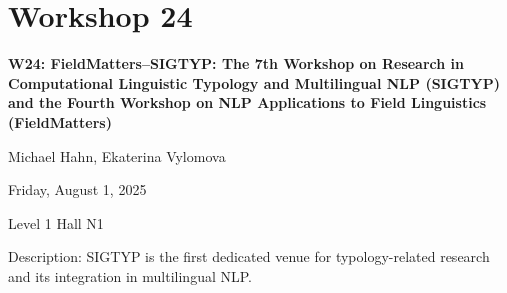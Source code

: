 \clearpage


\section[W24: FieldMatters–SIGTYP: The 7th Workshop on Research in Computational Linguistic Typology and Multilingual NLP (SIGTYP) and the Fourth Workshop on NLP Applications to Field Linguistics (FieldMatters)]{Workshop 24}

\begin{center}
    {\Large \textbf{W24: FieldMatters–SIGTYP: The 7th Workshop on Research in Computational Linguistic Typology and Multilingual NLP (SIGTYP) and the Fourth Workshop on NLP Applications to Field Linguistics (FieldMatters)}}

Michael Hahn, Ekaterina Vylomova

    Friday, August 1, 2025

 Level 1 Hall N1
    
\end{center}

Description: SIGTYP is the first dedicated venue for typology-related research and its integration in multilingual NLP.

